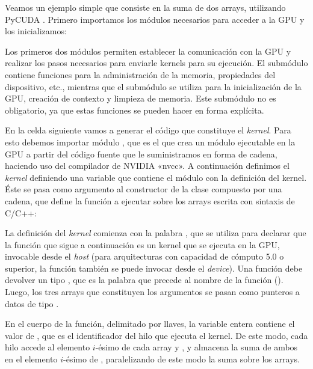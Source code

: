 Veamos un ejemplo simple que consiste en la suma de dos arrays, utilizando PyCUDA \cite{pycuda2012}. Primero importamos los módulos necesarios para acceder a la GPU y los inicializamos:


Los primeros dos módulos permiten establecer la comunicación con la GPU y realizar los pasos necesarios para enviarle kernels para su ejecución. El submódulo  contiene funciones para la administración de la memoria, propiedades del dispositivo, etc., mientras que el submódulo  se utiliza para la inicialización de la GPU, creación de contexto y limpieza de memoria. Este submódulo no es obligatorio, ya que estas funciones se pueden hacer en forma explícita. 

En la celda siguiente vamos a generar el código que constituye el \textit{kernel}. Para esto debemos importar módulo , que es el que crea un módulo ejecutable en la GPU a partir del código fuente que le suministramos en forma de cadena, haciendo uso del compilador de NVIDIA «nvcc». A continuación definimos el \textit{kernel} definiendo una variable  que contiene el módulo con la definición del kernel. Éste se pasa como argumento al constructor de la clase compuesto por una cadena, que define la función a ejecutar sobre los arrays escrita con sintaxis de C/C++: 

La definición del \textit{kernel} comienza con la palabra , que se utiliza para declarar que la función que sigue a continuación es un kernel que se ejecuta en la GPU, invocable desde el \textit{host} (para arquitecturas con capacidad de cómputo 5.0 o superior, la función también se puede invocar desde el \textit{device}). Una función  debe devolver un tipo , que es la palabra que precede al nombre de la función (). Luego, los tres arrays que constituyen los argumentos se pasan como punteros a datos de tipo .

En el cuerpo de la función, delimitado por llaves, la variable entera  contiene el valor de , que es el identificador del hilo que ejecuta el kernel. De este modo, cada hilo accede al elemento $i$-ésimo de cada array  y , y almacena la suma de ambos en el elemento $i$-ésimo de , paralelizando de este modo la suma sobre los arrays.


